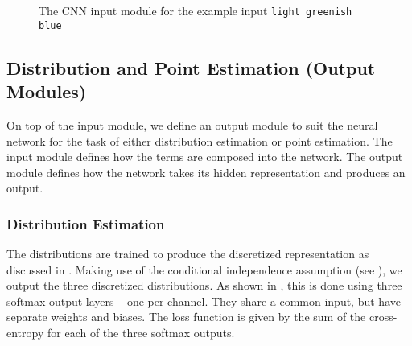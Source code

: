 \documentclass[]{clv3}
\newcommand{\natlang}[1]{\texttt{#1}}
\begin{document}
\begin{figure}
	
	\caption{The CNN input module for the example input \natlang{light greenish blue}}
	\label{fig:cnnmod}
\end{figure}





\subsection{Distribution and Point Estimation (Output Modules)}\label{sec:outputmod}
On top of the input module, we define an output module to suit the neural network for the task of either distribution estimation or point estimation.
The input module defines how the terms are composed into the network.
The output module defines how the network takes its hidden representation and produces an output.


\subsubsection{Distribution Estimation}\label{sec:distmod}
The distributions are trained to produce the discretized representation as discussed in .
Making use of the conditional independence assumption (see ), we output the three discretized distributions.
As shown in , this is done using three softmax output layers -- one per channel.
They share a common input, but have separate weights and biases.
The loss function is given by the sum of the cross-entropy for each of the three softmax outputs.
\end{document}
